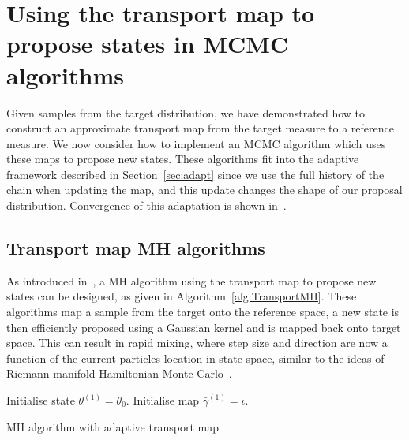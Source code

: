 \documentclass[final]{siamltex}
\begin{document}
\section[Transport map MCMC]{Using the transport map to propose states in MCMC algorithms}\label{sec:transport_algs}

Given samples from the target distribution, we have demonstrated how to construct an approximate transport map from the
target measure to a reference measure. We now consider how to implement an MCMC algorithm which uses
these maps to propose new states. These algorithms fit into the adaptive framework described in
Section~\ref{sec:adapt} since we use the full history of the chain when updating the map, and this update changes the shape of our proposal
distribution. Convergence of this adaptation is shown in~\cite{parno2014transport}.

\subsection{Transport map MH algorithms}

As introduced in~\cite{parno2014transport}, a MH algorithm using the transport map to propose new
states can be designed, as given in Algorithm~\ref{alg:TransportMH}. These algorithms
map a sample from the target onto the reference space, a new state is then efficiently
proposed using a Gaussian kernel and is mapped back onto target space. This can
result in rapid mixing, where step size and direction are now a function of the current particles location in state space, similar to the ideas of Riemann manifold Hamiltonian Monte Carlo~\cite{girolami2011riemann}.

\begin{table}
\begin{algorithm}[H]
\DontPrintSemicolon
\BlankLine
Initialise state $\theta^{(1)} = \theta_0$.\;
Initialise map $\bar{\gamma}^{(1)} = \iota$.\;
\caption{MH algorithm with adaptive transport map~\cite{parno2014transport}\label{alg:TransportMH}}
\end{algorithm}
\end{table}
\end{document}
